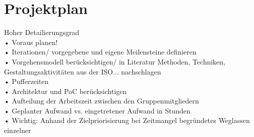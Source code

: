 
\section{Projektplan}

Hoher Detailierungsgrad\\
• Voraus planen!\\
• Iterationen/ vorgegebene und eigene Meilensteine deﬁnieren\\
• Vorgehensmodell berücksichtigen/ in Literatur Methoden, Techniken, Gestaltungsaktivitäten aus der ISO... nachschlagen\\
• Puﬀerzeiten\\
• Architektur und PoC berücksichtigen\\
• Aufteilung der Arbeitszeit zwischen den Gruppenmitgliedern\\
• Geplanter Aufwand vs. eingetretener Aufwand in Stunden\\
• Wichtig: Anhand der Zielpriorisierung bei Zeitmangel begründetes Weglassen einzelner\\
